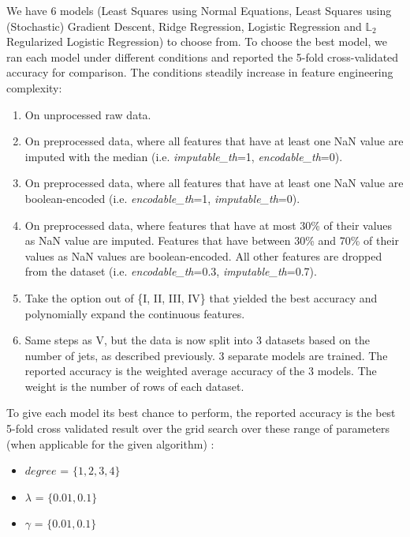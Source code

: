 \documentclass[10pt,conference,compsocconf]{IEEEtran}
\begin{document}
We have 6 models (Least Squares using Normal Equations, Least Squares using (Stochastic) Gradient Descent, Ridge Regression, Logistic Regression and $\mathbb{L}_2$ Regularized Logistic Regression) to choose from. To choose the best model, we ran each model under different conditions and reported the 5-fold cross-validated accuracy for comparison. The conditions steadily increase in feature engineering complexity:
\begin{enumerate}[label=\Roman*]
    \item On unprocessed raw data.
    \item On preprocessed data, where all features that have at least one NaN value are imputed with the median (i.e. \textit{imputable\_th}=1, \textit{encodable\_th}=0).
    \item On preprocessed data, where all features that have at least one NaN value are boolean-encoded (i.e. \textit{encodable\_th}=1, \textit{imputable\_th}=0).
    \item On preprocessed data, where features that have at most 30\% of their values as NaN value are imputed. Features that have between 30\% and 70\% of their values as NaN values are boolean-encoded. All other features are dropped from the dataset (i.e. \textit{encodable\_th}=0.3, \textit{imputable\_th}=0.7).
    \item Take the option out of \{I, II, III, IV\} that yielded the best accuracy and polynomially expand the continuous features.
    \item Same steps as V, but the data is now split into 3 datasets based on the number of jets, as described previously. 3 separate models are trained. The reported accuracy is the weighted average accuracy of the 3 models. The weight is the number of rows of each dataset.
\end{enumerate}

To give each model its best chance to perform, the reported accuracy is the best 5-fold cross validated result over the grid search over these range of parameters (when applicable for the given algorithm) :

\begin{itemize}
    \item $\textit{degree}$ = $\{1, 2, 3, 4\}$
    \item $\lambda$ = $\{0.01, 0.1\}$
    \item $\gamma$ = $\{0.01, 0.1\}$
\end{itemize}

\hfill
\end{document}
